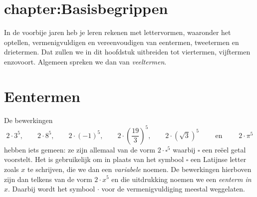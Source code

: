 \documentclass{ximera}
\begin{document}

\renewcommand{\contentsname}{\huge{Inhoud}} 


\setcounter{totaalaantalvoorbladen}{\value{page}}
















\section{chapter:Basisbegrippen}

In de voorbije jaren heb je leren rekenen met lettervormen, waaronder het optellen, ver\-menigvuldigen en vereenvoudigen van eentermen, tweetermen en drietermen. Dat zullen we in dit hoofdstuk uitbreiden tot viertermen, vijftermen enzovoort. Algemeen spreken we dan van {\em veeltermen}.














\section{Eentermen}

De bewerkingen
\[
2\cdot 3^5, \qquad 2\cdot 8^5, \qquad 2\cdot (-1)^5, \qquad 2\cdot\left(\frac{19}{3}\right)^5, \qquad 2\cdot\left(\sqrt{3}\right)^5 \qquad \text{ en } \qquad 2 \cdot \pi^5
\]
hebben iets gemeen: ze zijn allemaal van de vorm $2\cdot \square^5$ waarbij $\square$ een re\"eel getal voorstelt. Het is gebruikelijk om in plaats van het symbool $\square$ een Latijnse letter zoals $x$ te schrijven, die we dan een {\em variabele} noemen. De bewerkingen hierboven zijn dan telkens van de vorm $2 \cdot x^5$ en die uitdrukking noemen we een {\em eenterm in $x$}. Daarbij wordt het symbool $\cdot$ voor de vermenigvuldiging meestal weggelaten. 
\end{document}
